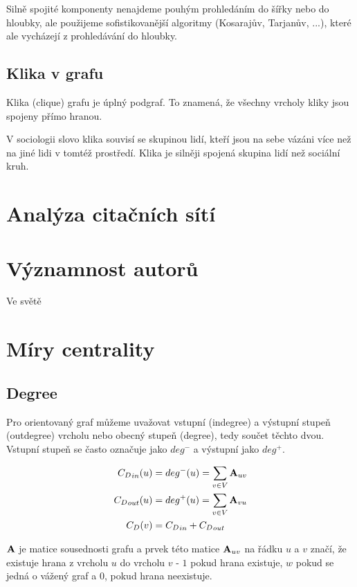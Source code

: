 \documentclass[12pt,titlepage]{report}
\begin{document}
Silně spojité komponenty nenajdeme pouhým prohledáním do šířky nebo do hloubky,
ale použijeme sofistikovanější algoritmy (Kosarajův, Tarjanův, ...), které ale
vycházejí z prohledávání do hloubky.

\subsection{Klika v grafu}
Klika (clique) grafu je úplný podgraf. To znamená, že všechny vrcholy kliky
jsou spojeny přímo hranou.

V sociologii slovo klika souvisí se skupinou lidí, kteří jsou na sebe vázáni
více než na jiné lidi v tomtéž prostředí. Klika je silněji spojená skupina lidí
než sociální kruh.

\section{Analýza citačních sítí}
\section{Významnost autorů}
Ve světě

\section{Míry centrality}
\subsection{Degree}
Pro orientovaný graf můžeme uvažovat vstupní (indegree) a výstupní stupeň
(outdegree) vrcholu nebo obecný stupeň (degree), tedy součet těchto dvou.
Vstupní stupeň se často označuje jako $deg^-$ a výstupní jako $deg^+$.

\begin{align}
{C_D}_{in}(u) &= deg^-(u)  = \displaystyle\sum\limits_{v \in V} {\bf A}_{uv} \\
{C_D}_{out}(u) &= deg^+(u) = \displaystyle\sum\limits_{v \in V} {\bf A}_{vu} \\
{C_D}(v) &= {C_D}_{in} + {C_D}_{out}
\end{align}

${\bf A}$ je matice sousednosti grafu a prvek této matice ${\bf A}_{uv}$ na
řádku $u$ a $v$ značí, že existuje hrana z vrcholu $u$ do vrcholu $v$ - $1$
pokud hrana existuje, $w$ pokud se jedná o vážený graf a $0$, pokud hrana
neexistuje.
\end{document}

